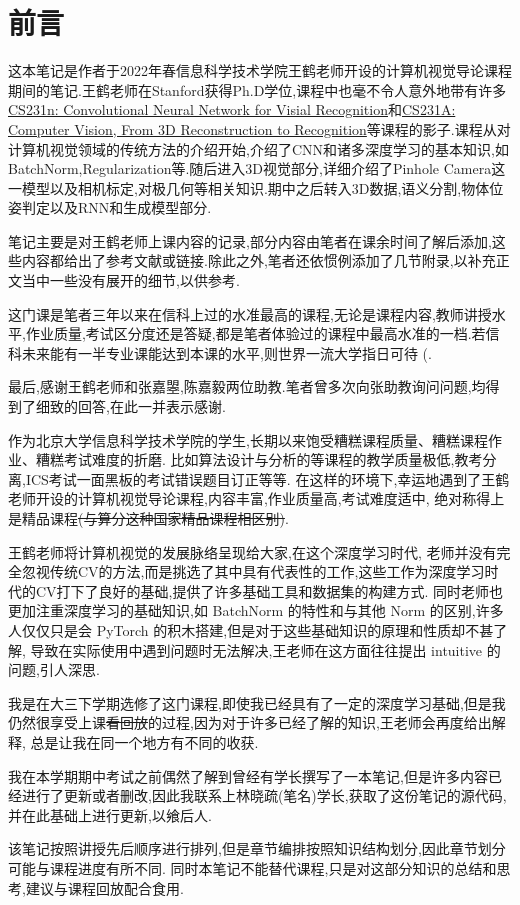 \section*{前言}

这本笔记是作者于2022年春信息科学技术学院王鹤老师开设的计算机视觉导论课程期间的笔记.王鹤老师在Stanford获得Ph.D学位,课程中也毫不令人意外地带有许多\href{https://cs231n.github.io/}{CS231n: Convolutional Neural Network for Visial Recognition}和\href{https://web.stanford.edu/class/cs231a/course_notes.html}{CS231A: Computer Vision, From 3D Reconstruction to Recognition}等课程的影子.课程从对计算机视觉领域的传统方法的介绍开始,介绍了CNN和诸多深度学习的基本知识,如BatchNorm,Regularization等.随后进入3D视觉部分,详细介绍了Pinhole Camera这一模型以及相机标定,对极几何等相关知识.期中之后转入3D数据,语义分割,物体位姿判定以及RNN和生成模型部分.

笔记主要是对王鹤老师上课内容的记录,部分内容由笔者在课余时间了解后添加,这些内容都给出了参考文献或链接.除此之外,笔者还依惯例添加了几节附录,以补充正文当中一些没有展开的细节,以供参考.

这门课是笔者三年以来在信科上过的水准最高的课程,无论是课程内容,教师讲授水平,作业质量,考试区分度还是答疑,都是笔者体验过的课程中最高水准的一档.若信科未来能有一半专业课能达到本课的水平,则世界一流大学指日可待 (.

最后,感谢王鹤老师和张嘉曌,陈嘉毅两位助教.笔者曾多次向张助教询问问题,均得到了细致的回答,在此一并表示感谢.



作为北京大学信息科学技术学院的学生,长期以来饱受糟糕课程质量、糟糕课程作业、糟糕考试难度的折磨.
比如算法设计与分析的等课程的教学质量极低,教考分离,ICS考试一面黑板的考试错误题目订正等等.
在这样的环境下,幸运地遇到了王鹤老师开设的计算机视觉导论课程,内容丰富,作业质量高,考试难度适中,
绝对称得上是精品课程\sout{(与算分这种国家精品课程相区别)}.

王鹤老师将计算机视觉的发展脉络呈现给大家,在这个深度学习时代,
老师并没有完全忽视传统CV的方法,而是挑选了其中具有代表性的工作,这些工作为深度学习时代的CV打下了良好的基础,提供了许多基础工具和数据集的构建方式.
同时老师也更加注重深度学习的基础知识,如 BatchNorm 的特性和与其他 Norm 的区别,许多人仅仅只是会 PyTorch 的积木搭建,但是对于这些基础知识的原理和性质却不甚了解,
导致在实际使用中遇到问题时无法解决,王老师在这方面往往提出 intuitive 的问题,引人深思.

我是在大三下学期选修了这门课程,即使我已经具有了一定的深度学习基础,但是我仍然很享受上课\sout{看回放}的过程,因为对于许多已经了解的知识,王老师会再度给出解释,
总是让我在同一个地方有不同的收获.

我在本学期期中考试之前偶然了解到曾经有学长撰写了一本笔记,但是许多内容已经进行了更新或者删改,因此我联系上林晓疏(笔名)学长,获取了这份笔记的源代码,
并在此基础上进行更新,以飨后人.

该笔记按照讲授先后顺序进行排列,但是章节编排按照知识结构划分,因此章节划分可能与课程进度有所不同.
同时本笔记不能替代课程,只是对这部分知识的总结和思考,建议与课程回放配合食用.

